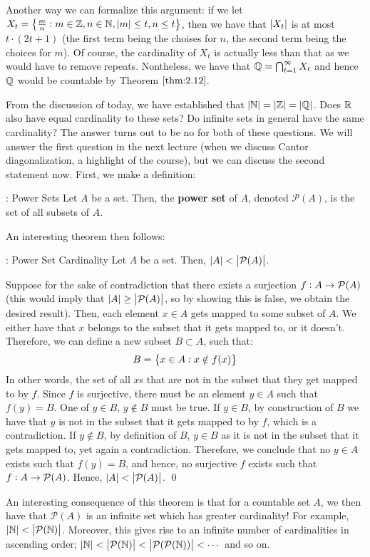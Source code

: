 Another way we can formalize this argument: if we let $X_t = \set{\frac{m}{n}: m \in \mathbb{Z}, n \in \mathbb{N}, \abs{m} \leq t, n \leq t}$, then we have that $\abs{X_t}$ is at most $t\cdot (2t+1)$ (the first term being the choises for $n$, the second term being the choices for $m$). Of course, the cardinality of $X_t$ is actually less than that as we would have to remove repeats. Nontheless, we have that $\mathbb{Q} = \bigcap_{t=1}^\infty X_t$ and hence $\mathbb{Q}$ would be countable by Theorem $\ref{thm:2.12}$. 

From the discussion of today, we have established that $\abs{\mathbb{N}} = \abs{\mathbb{Z}} = \abs{\mathbb{Q}}$. Does $\mathbb{R}$ also have equal cardinality to these sets? Do infinite sets in general have the same cardinality? The answer turns out to be no for both of these questions. We will answer the first question in the next lecture (when we discuss Cantor diagonalization, a highlight of the course), but we can discuss the second statement now. First, we make a definition:
\begin{ndef}{: Power Sets}
    Let $A$ be a set. Then, the \textbf{power set} of $A$, denoted $\mathcal{P}(A)$, is the set of all subsets of $A$. 
\end{ndef}
\noindent An interesting theorem then follows:
\begin{ntheorem}{: Power Set Cardinality}
    Let $A$ be a set. Then, $\abs{A} < \abs{\mathcal{P}(A)}$.
\end{ntheorem}
\begin{nproof}
    Suppose for the sake of contradiction that there exists a surjection $f: A\rightarrow \mathcal{P}({A})$ (this would imply that $\abs{A} \geq \abs{\mathcal{P}({A})}$, so by showing this is false, we obtain the desired result). Then, each element $x \in A$ gets mapped to some subset of $A$. We either have that $x$ belongs to the subset that it gets mapped to, or it doesn't. Therefore, we can define a new subset $B \subset A$, such that:
    \[B = \set{x\in A: x \notin f(x)}\]
    In other words, the set of all $x$s that are not in the subset that they get mapped to by $f$. Since $f$ is surjective, there must be an element $y \in A$ such that $f(y) = B$. One of $y \in B$, $y \notin B$ must be true. If $y \in B$, by construction of $B$ we have that $y$ is not in the subset that it gets mapped to by $f$, which is a contradiction. If $y \notin B$, by definition of $B$, $y \in B$ as it is not in the subset that it gets mapped to, yet again a contradiction. Therefore, we conclude that no $y \in A$ exists such that $f(y) = B$, and hence, no surjective $f$ exists such that $f: A \rightarrow \mathcal{P}({A})$. Hence, $\abs{A} < \abs{\mathcal{P}({A})}$. \qed
\end{nproof}
\noindent An interesting consequence of this theorem is that for a countable set $A$, we then have that $\mathcal{P}(A)$ is an infinite set which has greater cardinality! For example, $\abs{\mathbb{N}} < \abs{\mathcal{P}(\mathbb{N})}$. Moreover, this gives rise to an infinite number of cardinalities in ascending order; $\abs{\mathbb{N}} < \abs{\mathcal{P}({\mathbb{N}})} < \abs{\mathcal{P}({\mathcal{P}({\mathbb{N}})})} < \cdots$ and so on.

